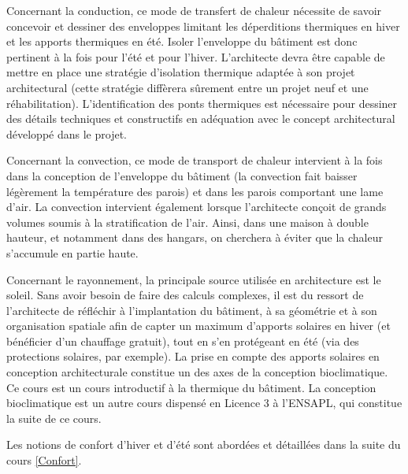 Concernant la conduction, ce mode de transfert de chaleur nécessite de savoir concevoir et dessiner des enveloppes limitant les déperditions thermiques en hiver et les apports thermiques en été. Isoler l’enveloppe du bâtiment est donc pertinent à la fois pour l’été et pour l’hiver. L’architecte devra être capable de mettre en place une stratégie d’isolation thermique adaptée à son projet architectural (cette stratégie diffèrera sûrement entre un projet neuf et une réhabilitation). L’identification des ponts thermiques est nécessaire pour dessiner des détails techniques et constructifs en adéquation avec le concept architectural développé dans le projet.

Concernant la convection, ce mode de transport de chaleur intervient à la fois dans la conception de l’enveloppe du bâtiment (la convection fait baisser légèrement la température des parois) et dans les parois comportant une lame d’air. La convection intervient également lorsque l’architecte conçoit de grands volumes soumis à la stratification de l’air. Ainsi, dans une maison à double hauteur, et notamment dans des hangars, on cherchera à éviter que la chaleur s’accumule en partie haute.

Concernant le rayonnement, la principale source utilisée en architecture est le soleil. Sans avoir besoin de faire des calculs complexes, il est du ressort de l’architecte de réfléchir à l’implantation du bâtiment, à sa géométrie et à son organisation spatiale afin de capter un maximum d’apports solaires en hiver (et bénéficier d’un chauffage gratuit), tout en s’en protégeant en été (via des protections solaires, par exemple). La prise en compte des apports solaires en conception architecturale constitue un des axes de la conception bioclimatique. Ce cours est un cours introductif à la thermique du bâtiment. La conception bioclimatique est un autre cours dispensé en Licence 3 à l’ENSAPL, qui constitue la suite de ce cours.

Les notions de confort d’hiver et d’été sont abordées et détaillées dans la suite du cours \ref{Confort}.